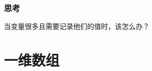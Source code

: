 \begin{frame}[fragile]
    \frametitle{思考}

    \begin{block}{}
        \vspace{.5cm}
        \begin{center}
            当变量很多且需要记录他们的值时，该怎么办？
        \end{center}
        \vspace{.5cm}
    \end{block}
\end{frame}


\section{一维数组}

